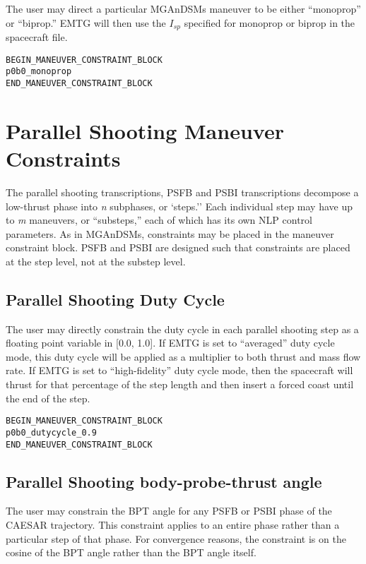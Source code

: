 \documentclass[11pt]{article}
\begin{document}
The user may direct a particular MGAnDSMs maneuver to be either ``monoprop'' or ``biprop.'' EMTG will then use the $I_{sp}$ specified for monoprop or biprop in the spacecraft file.

\begin{verbatim}
BEGIN_MANEUVER_CONSTRAINT_BLOCK
p0b0_monoprop
END_MANEUVER_CONSTRAINT_BLOCK
\end{verbatim}


\section{Parallel Shooting Maneuver Constraints}
\label{subsec:PS_maneuver_constraints}

The parallel shooting transcriptions, \ac{PSFB} and \ac{PSBI} transcriptions decompose a low-thrust phase into \textit{n} subphases, or `steps.'' Each individual step may have up to \textit{m} maneuvers, or ``substeps,'' each of which has its own \ac{NLP} control parameters. As in \ac{MGAnDSMs}, constraints may be placed in the maneuver constraint block. \ac{PSFB} and \ac{PSBI} are designed such that constraints are placed at the step level, not at the substep level.

\subsection{Parallel Shooting Duty Cycle}
\label{subsec:PS_duty_cycle}

The user may directly constrain the duty cycle in each parallel shooting step as a floating point variable in [0.0, 1.0]. If EMTG is set to ``averaged'' duty cycle mode, this duty cycle will be applied as a multiplier to both thrust and mass flow rate. If EMTG is set to ``high-fidelity'' duty cycle mode, then the spacecraft will thrust for that percentage of the step length and then insert a forced coast until the end of the step.

\begin{verbatim}
BEGIN_MANEUVER_CONSTRAINT_BLOCK
p0b0_dutycycle_0.9
END_MANEUVER_CONSTRAINT_BLOCK
\end{verbatim}

\subsection{Parallel Shooting body-probe-thrust angle}
\label{subsec:PS_BPT}

The user may constrain the \ac{BPT} angle for any \ac{PSFB} or \ac{PSBI} phase of the CAESAR trajectory. This constraint applies to an entire phase rather than a particular step of that phase. For convergence reasons, the constraint is on the cosine of the BPT angle rather than the BPT angle itself.
\end{document}
